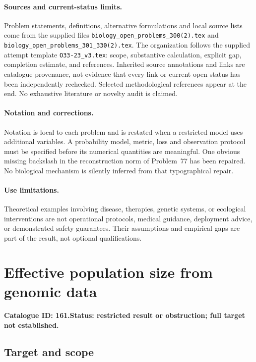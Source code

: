 \documentclass[11pt]{article}
\begin{document}
\paragraph{Sources and current-status limits.}
Problem statements, definitions, alternative formulations and local source lists
come from the supplied files
\texttt{biology\_open\_problems\_300(2).tex} and
\texttt{biology\_open\_problems\_301\_330(2).tex}.
The organization follows the supplied attempt template
\texttt{O33-23\_v3.tex}: scope, substantive calculation, explicit gap,
completion estimate, and references. Inherited source annotations and links are
catalogue provenance, not evidence that every link or current open status has
been independently rechecked. Selected methodological references appear at the
end. No exhaustive literature or novelty audit is claimed.

\paragraph{Notation and corrections.}
Notation is local to each problem and is restated when a restricted model uses
additional variables. A probability model, metric, loss and observation protocol
must be specified before its numerical quantities are meaningful. One obvious
missing backslash in the reconstruction norm of Problem~77 has been repaired.
No biological mechanism is silently inferred from that typographical repair.

\paragraph{Use limitations.}
Theoretical examples involving disease, therapies, genetic systems, or ecological
interventions are not operational protocols, medical guidance, deployment advice,
or demonstrated safety guarantees. Their assumptions and empirical gaps are part
of the result, not optional qualifications.

\setcounter{section}{160}
\section{Effective population size from genomic data}
\label{prob:161}
\noindent\textbf{Catalogue ID: 161.}\quad \textbf{Status: restricted result or obstruction; full target not established.}
\subsection{Target and scope}
\end{document}
